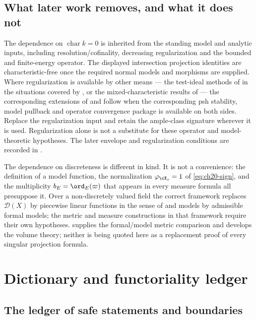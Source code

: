 \subsection{What later work removes, and what it does not}
\label{sec:ch30-scope-later}

The dependence on $\operatorname{char}k=0$ is inherited from the
standing model and analytic inputs, including resolution/cofinality,
decreasing regularization and the bounded and finite-energy operator.
The displayed intersection projection identities are
characteristic-free once the required normal models and morphisms
are supplied.  Where
regularization is available by other means --- the test-ideal methods of
\cite{GJKM19} in the situations covered by
, or the mixed-characteristic
results of \cite{FGK25} --- the corresponding extensions of
 and
 follow when the corresponding psh stability, model pullback and
operator convergence package is available on both sides.  Replace the
regularization input and retain the ample-class signature wherever it
is used.  Regularization alone is not a substitute for these operator
and model-theoretic hypotheses.  The later envelope and regularization
conditions are recorded in
.

The dependence on discreteness is different in kind.  It is not a
convenience: the definition of a model function, the normalization
$\varphi_{\cX_s}=1$ of \eqref{eq:ch20-sign}, and the multiplicity
$b_E=\ord_E(\varpi)$ that appears in every measure formula all presuppose
it.  Over a non-discretely valued field the correct framework replaces
$\mathcal D(X)$ by piecewise linear functions in the sense of
 and models by admissible formal models; the metric and measure constructions in that framework require
their own hypotheses.  \cite{GM19} supplies the formal/model metric
comparison and \cite{BGM21} develops the volume theory; neither is
being quoted here as a replacement proof of every singular projection
formula.

\section{Dictionary and functoriality ledger}
\label{sec:ch30-ledger}

\subsection{The ledger of safe statements and boundaries}
\label{sec:ch30-ledger-list}

